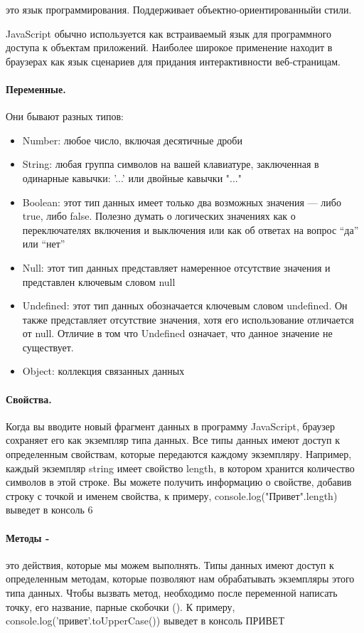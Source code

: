 \documentclass[14pt,Diplom]{diplomwork}
\begin{document}
это язык программирования. Поддерживает объектно-ориентированныйи стили.

JavaScript обычно используется как встраиваемый язык для программного доступа к объектам приложений. Наиболее широкое применение находит в браузерах как язык сценариев для придания интерактивности веб-страницам.

\paragraph{Переменные.}
Они бывают разных типов: 
 \begin{itemize}
	\item Number: любое число, включая десятичные дроби
	\item String: любая группа символов на вашей клавиатуре, заключенная в одинарные кавычки: '...' или двойные кавычки "..."
	\item Boolean: этот тип данных имеет только два возможных значения — либо true, либо false. Полезно думать о логических значениях как о переключателях включения и выключения или как об ответах на вопрос “да” или “нет”
	\item Null: этот тип данных представляет намеренное отсутствие значения и представлен ключевым словом null
	\item Undefined: этот тип данных обозначается ключевым словом undefined. Он также представляет отсутствие значения, хотя его использование отличается от null. Отличие в том что Undefined означает, что данное значение не существует.
	\item Object: коллекция связанных данных
\end{itemize}

\paragraph{Свойства.}
 Когда вы вводите новый фрагмент данных в программу JavaScript, браузер сохраняет его как экземпляр типа данных. Все типы данных имеют доступ к определенным свойствам, которые передаются каждому экземпляру. Например, каждый экземпляр string имеет свойство length, в котором хранится количество символов в этой строке. Вы можете получить информацию о свойстве, добавив строку с точкой и именем свойства, к примеру, console.log("Привет".length) выведет в консоль 6

\paragraph{Методы -}
это действия, которые мы можем выполнять. Типы данных имеют доступ к определенным методам, которые позволяют нам обрабатывать экземпляры этого типа данных. Чтобы вызвать метод, необходимо после переменной написать точку, его название, парные скобочки (). К примеру, console.log('привет'.toUpperCase()) выведет в консоль ПРИВЕТ
\end{document}
